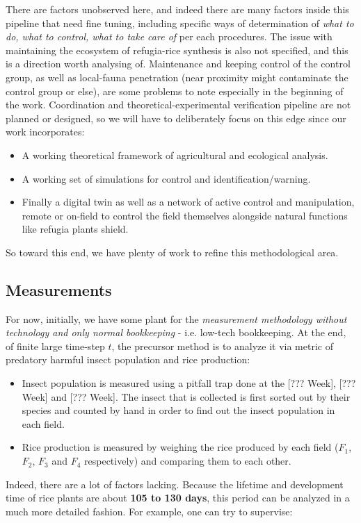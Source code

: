 \documentclass[twocolumn,letterpaper, 12pt]{article}
\begin{document}
There are factors unobserved here, and indeed there are many factors inside this pipeline that need fine tuning, including specific ways of determination of \textit{what to do, what to control, what to take care of} per each procedures. The issue with maintaining the ecosystem of refugia-rice synthesis is also not specified, and this is a direction worth analysing of. Maintenance and keeping control of the control group, as well as local-fauna penetration (near proximity might contaminate the control group or else), are some problems to note especially in the beginning of the work. Coordination and theoretical-experimental verification pipeline are not planned or designed, so we will have to deliberately focus on this edge since our work incorporates: 
\begin{itemize}
    \item A working theoretical framework of agricultural and ecological analysis. 
    \item A working set of simulations for control and identification/warning. 
    \item Finally a digital twin as well as a network of active control and manipulation, remote or on-field to control the field themselves alongside natural functions like refugia plants shield. 
\end{itemize}
So toward this end, we have plenty of work to refine this methodological area. 
\subsection{Measurements}

For now, initially, we have some plant for the \textit{measurement methodology without technology and only normal bookkeeping} - i.e. low-tech bookkeeping. At the end, of finite large time-step $t$, the precursor method is to analyze it via metric of predatory harmful insect population and rice production: 
\begin{itemize}
    \item Insect population is measured using a pitfall trap done at the [??? Week], [??? Week] and [??? Week]. The insect that is collected is first sorted out by their species and counted by hand in order to find out the insect population in each field.
    \item Rice production is measured by weighing the rice produced by each field ($F_1$, $F_2$, $F_3$ and $F_4$ respectively) and comparing them to each other.
\end{itemize}
Indeed, there are a lot of factors lacking. Because the lifetime and development time of rice plants are about \textbf{105 to 130 days}, this period can be analyzed in a much more detailed fashion. For example, one can try to supervise: 
\end{document}
